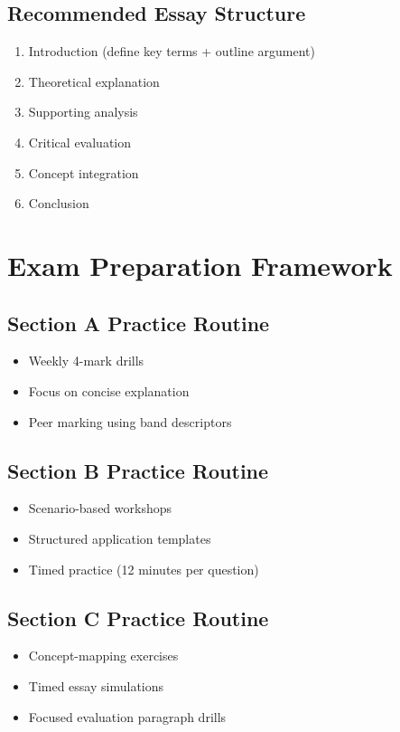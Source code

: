\documentclass[12pt,a4paper]{article}
\begin{document}
\subsection*{Recommended Essay Structure}
\begin{enumerate}
    \item Introduction (define key terms + outline argument)
    \item Theoretical explanation
    \item Supporting analysis
    \item Critical evaluation
    \item Concept integration
    \item Conclusion
\end{enumerate}

\newpage

\section{Exam Preparation Framework}

\subsection*{Section A Practice Routine}
\begin{itemize}
    \item Weekly 4-mark drills
    \item Focus on concise explanation
    \item Peer marking using band descriptors
\end{itemize}

\subsection*{Section B Practice Routine}
\begin{itemize}
    \item Scenario-based workshops
    \item Structured application templates
    \item Timed practice (12 minutes per question)
\end{itemize}

\subsection*{Section C Practice Routine}
\begin{itemize}
    \item Concept-mapping exercises
    \item Timed essay simulations
    \item Focused evaluation paragraph drills
\end{itemize}
\end{document}
